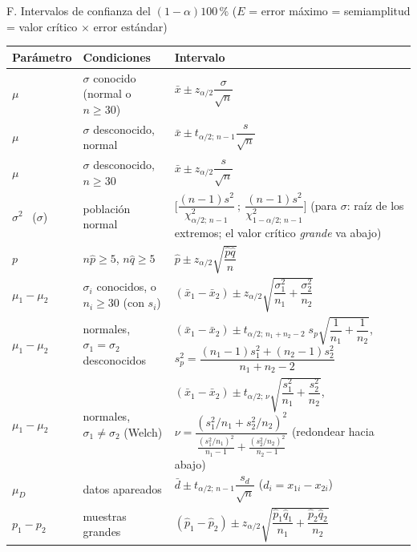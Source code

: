 \documentclass[10pt,a4paper]{extarticle}
\newcommand{\xb}{\bar{x}}
\newcommand{\chis}{\chi^2}
\newcommand{\sq}[1]{\sqrt{#1}}
\begin{document}
\begin{hoja}{F. Intervalos de confianza del $(1-\alpha)100\,\%$ \quad ($E$ = error máximo = semiamplitud = valor crítico $\times$ error estándar)}
\renewcommand{\arraystretch}{1.5}
\begin{tabular}{@{}>{\raggedright\arraybackslash}p{1.7cm}>{\raggedright\arraybackslash}p{4.6cm}>{\raggedright\arraybackslash}p{10.9cm}@{}}
\toprule
\textbf{Parámetro} & \textbf{Condiciones} & \textbf{Intervalo}\\\midrule
$\mu$ & $\sigma$ conocido (normal o $n\ge30$) & $\xb\pm z_{\alpha/2}\dfrac{\sigma}{\sq n}$\\
$\mu$ & $\sigma$ desconocido, normal & $\xb\pm t_{\alpha/2;\,n-1}\dfrac{s}{\sq n}$\\
$\mu$ & $\sigma$ desconocido, $n\ge30$ & $\xb\pm z_{\alpha/2}\dfrac{s}{\sq n}$\\
$\sigma^2$ \ ($\sigma$) & población normal & $\Big[\dfrac{(n-1)s^2}{\chis_{\alpha/2;\,n-1}}\ ;\ \dfrac{(n-1)s^2}{\chis_{1-\alpha/2;\,n-1}}\Big]$ \quad (para $\sigma$: raíz de los extremos; el valor crítico \emph{grande} va abajo)\\
$p$ & $n\hat p\ge5$, $n\hat q\ge5$ & $\hat p\pm z_{\alpha/2}\sq{\dfrac{\hat p\hat q}{n}}$\\
$\mu_1-\mu_2$ & $\sigma_i$ conocidos, o $n_i\ge30$ (con $s_i$) & $(\xb_1-\xb_2)\pm z_{\alpha/2}\sq{\dfrac{\sigma_1^2}{n_1}+\dfrac{\sigma_2^2}{n_2}}$\\
$\mu_1-\mu_2$ & normales, $\sigma_1=\sigma_2$ desconocidos & $(\xb_1-\xb_2)\pm t_{\alpha/2;\,n_1+n_2-2}\;s_p\sq{\dfrac1{n_1}+\dfrac1{n_2}}$, \quad $s_p^2=\dfrac{(n_1-1)s_1^2+(n_2-1)s_2^2}{n_1+n_2-2}$\\
$\mu_1-\mu_2$ & normales, $\sigma_1\ne\sigma_2$ (Welch) & $(\xb_1-\xb_2)\pm t_{\alpha/2;\,\nu}\sq{\dfrac{s_1^2}{n_1}+\dfrac{s_2^2}{n_2}}$, \quad $\nu=\dfrac{(s_1^2/n_1+s_2^2/n_2)^2}{\frac{(s_1^2/n_1)^2}{n_1-1}+\frac{(s_2^2/n_2)^2}{n_2-1}}$ (redondear hacia abajo)\\
$\mu_D$ & datos apareados & $\bar d\pm t_{\alpha/2;\,n-1}\dfrac{s_d}{\sq n}$ \quad ($d_i=x_{1i}-x_{2i}$)\\
$p_1-p_2$ & muestras grandes & $(\hat p_1-\hat p_2)\pm z_{\alpha/2}\sq{\dfrac{\hat p_1\hat q_1}{n_1}+\dfrac{\hat p_2\hat q_2}{n_2}}$\\
\bottomrule
\end{tabular}


\end{hoja}
\end{document}
